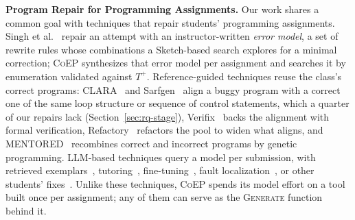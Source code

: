\documentclass[acmsmall,screen,review,anonymous,nonacm]{acmart}
\newcommand{\tool}{\textsc{CoEP}\xspace}
\newcommand{\Fn}[1]{\textsc{#1}}
\begin{document}
\textbf{Program Repair for Programming Assignments.} Our work shares a common goal with techniques that repair students' programming assignments. Singh et al.~\cite{singh2013automated} repair an attempt with an instructor-written \emph{error model}, a set of rewrite rules whose combinations a Sketch-based search explores for a minimal correction; \tool synthesizes that error model per assignment and searches it by enumeration validated against $T^{+}$. Reference-guided techniques reuse the class's correct programs: CLARA~\cite{gulwani2018automated} and Sarfgen~\cite{wang2018search} align a buggy program with a correct one of the same loop structure or sequence of control statements, which a quarter of our repairs lack (Section~\ref{sec:rq-stage}), Verifix~\cite{ahmed2022verifix} backs the alignment with formal verification, Refactory~\cite{hu2019re} refactors the pool to widen what aligns, and MENTORED~\cite{choi2025automated} recombines correct and incorrect programs by genetic programming. LLM-based techniques query a model per submission, with retrieved exemplars~\cite{zhang2024pydex}, tutoring~\cite{yang2024cref}, fine-tuning~\cite{liu2024fastfixer,yang2026morepair}, fault localization~\cite{dai2025less,orvalho2025counterexample,orvalho2025mentor}, or other students' fixes~\cite{dai2026learner}. Unlike these techniques, \tool spends its model effort on a tool built once per assignment; any of them can serve as the \Fn{Generate} function behind it.
\end{document}
